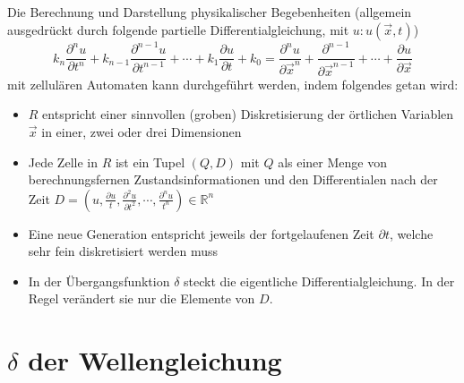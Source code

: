 \documentclass[11pt]{article} %
\theoremstyle{definition}
\begin{document}
Die Berechnung und Darstellung physikalischer Begebenheiten (allgemein ausgedrückt durch folgende partielle Differentialgleichung, mit $u: u(\vec{x}, t)$)
\begin{equation*}
k_n \frac{\partial^n u}{\partial t^n} + k_{n-1} \frac{\partial^{n-1} u}{\partial t^{n-1}} + \cdots + k_1 \frac{\partial u}{\partial t} + k_0 = \frac{\partial^n u}{\partial  \vec{x}^n} + \frac{\partial^{n-1}}{\partial \vec{x}^{n-1}} + \cdots + \frac{\partial u}{\partial \vec{x}}
\end{equation*}
mit zellulären Automaten kann durchgeführt werden, indem folgendes getan wird:
\begin{itemize}
\item $R$ entspricht einer sinnvollen (groben) Diskretisierung der örtlichen Variablen $\vec{x}$ in einer, zwei oder drei Dimensionen
\item Jede Zelle in $R$ ist ein Tupel $(Q, D)$ mit $Q$ als einer Menge von berechnungsfernen Zustandsinformationen und den Differentialen nach der Zeit $D = \left( u, \frac{\partial u}{t}, \frac{\partial^2 u}{\partial t^2}, \cdots, \frac{\partial^n u}{t^n} \right)  \in \mathbb{R}^n$
\item Eine neue Generation entspricht jeweils der fortgelaufenen Zeit $\partial t$, welche sehr fein diskretisiert werden muss
\item In der Übergangsfunktion $\delta$ steckt die eigentliche Differentialgleichung. In der Regel verändert sie nur die Elemente von $D$.
\end{itemize}

\section{$\delta$ der Wellengleichung}
\end{document}
